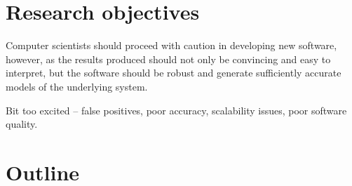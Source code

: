 \section{Research objectives}
Computer scientists should proceed with caution in developing new software, however, as the results produced should not only be convincing and easy to interpret, but the software should be robust and generate sufficiently accurate models of the underlying system.

Bit too excited -- false positives, poor accuracy, scalability issues, poor software quality. 

\section{Outline} %